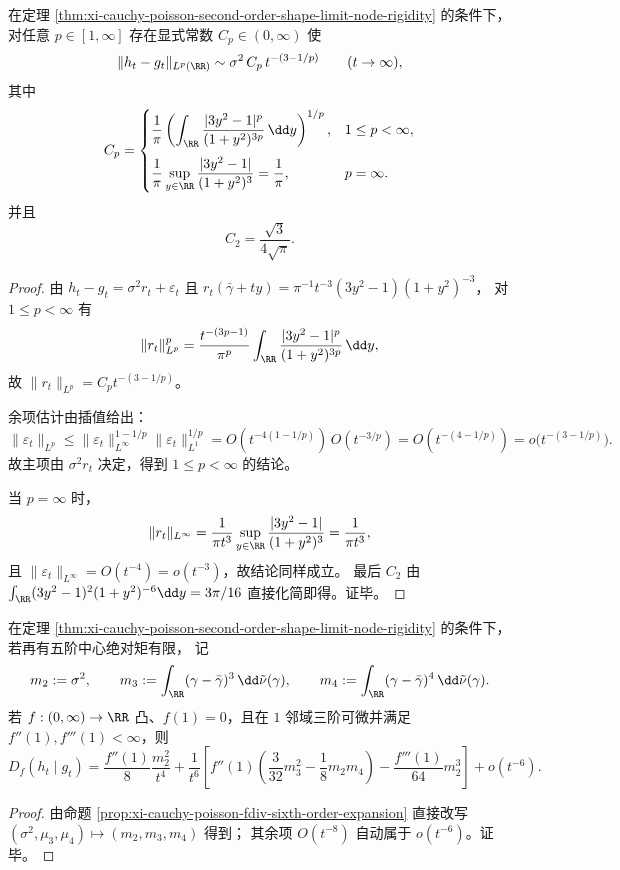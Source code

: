\begin{theorem}\label{thm:xi-cauchy-poisson-all-lp-sharp-scaling}
在定理 \ref{thm:xi-cauchy-poisson-second-order-shape-limit-node-rigidity} 的条件下，对任意 \(p\in[1,\infty]\) 存在显式常数 \(C_p\in(0,\infty)\) 使
\[
\|h_t-g_t\|_{L^p(\RR)}
\sim
\sigma^2\,C_p\,t^{-(3-1/p)}
\qquad(t\to\infty),
\]
其中
\[
C_p=
\begin{cases}
\displaystyle
\frac1\pi\left(\int_{\RR}\frac{|3y^2-1|^p}{(1+y^2)^{3p}}\,\dd y\right)^{1/p},
&1\le p<\infty,\\[1.2em]
\displaystyle
\frac1\pi\sup_{y\in\RR}\frac{|3y^2-1|}{(1+y^2)^3}=\frac1\pi,
&p=\infty.
\end{cases}
\]
并且
\[
C_2=\frac{\sqrt3}{4\sqrt\pi}.
\]
\end{theorem}
\begin{proof}
由 \(h_t-g_t=\sigma^2r_t+\varepsilon_t\) 且
\(
r_t(\bar\gamma+ty)=\pi^{-1}t^{-3}(3y^2-1)(1+y^2)^{-3}
\)，
对 \(1\le p<\infty\) 有
\[
\|r_t\|_{L^p}^p
=\frac{t^{-(3p-1)}}{\pi^p}\int_{\RR}\frac{|3y^2-1|^p}{(1+y^2)^{3p}}\,\dd y,
\]
故 \(\|r_t\|_{L^p}=C_p t^{-(3-1/p)}\)。

余项估计由插值给出：
\[
\|\varepsilon_t\|_{L^p}
\le
\|\varepsilon_t\|_{L^\infty}^{1-1/p}\|\varepsilon_t\|_{L^1}^{1/p}
=O(t^{-4(1-1/p)})\,O(t^{-3/p})
=O(t^{-(4-1/p)})
=o\!\bigl(t^{-(3-1/p)}\bigr).
\]
故主项由 \(\sigma^2r_t\) 决定，得到 \(1\le p<\infty\) 的结论。

当 \(p=\infty\) 时，
\[
\|r_t\|_{L^\infty}
=\frac1{\pi t^3}\sup_{y\in\RR}\frac{|3y^2-1|}{(1+y^2)^3}
=\frac1{\pi t^3},
\]
且 \(\|\varepsilon_t\|_{L^\infty}=O(t^{-4})=o(t^{-3})\)，故结论同样成立。
最后 \(C_2\) 由
\(
\int_{\RR}(3y^2-1)^2(1+y^2)^{-6}\dd y=3\pi/16
\)
直接化简即得。证毕。
\end{proof}

\begin{corollary}\label{cor:xi-cauchy-poisson-fdiv-sixth-order-moment-rewrite}
在定理 \ref{thm:xi-cauchy-poisson-second-order-shape-limit-node-rigidity} 的条件下，若再有五阶中心绝对矩有限，
记
\[
m_2:=\sigma^2,\qquad
m_3:=\int_{\RR}(\gamma-\bar\gamma)^3\,\dd\tilde\nu(\gamma),\qquad
m_4:=\int_{\RR}(\gamma-\bar\gamma)^4\,\dd\tilde\nu(\gamma).
\]
若 \(f:(0,\infty)\to\RR\) 凸、\(f(1)=0\)，且在 \(1\) 邻域三阶可微并满足 \(f''(1),f'''(1)<\infty\)，则
\[
D_f(h_t\mid g_t)
=\frac{f''(1)}{8}\frac{m_2^2}{t^4}
+\frac1{t^6}\left[
f''(1)\left(\frac{3}{32}m_3^2-\frac18 m_2m_4\right)
-\frac{f'''(1)}{64}m_2^3
\right]
+o(t^{-6}).
\]
\end{corollary}
\begin{proof}
由命题 \ref{prop:xi-cauchy-poisson-fdiv-sixth-order-expansion} 直接改写 \((\sigma^2,\mu_3,\mu_4)\mapsto(m_2,m_3,m_4)\) 得到；
其余项 \(O(t^{-8})\) 自动属于 \(o(t^{-6})\)。证毕。
\end{proof}

